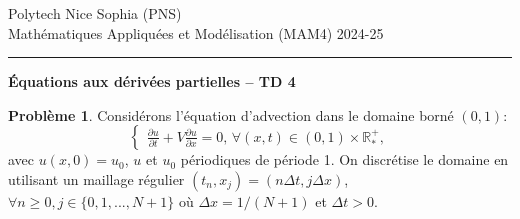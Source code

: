 \documentclass[12pt,a4paper]{article}
\begin{document}
 \hfill Polytech Nice Sophia (PNS)\\
\noindent Math\'ematiques Appliqu\'ees et Mod\'elisation (MAM4) \hfill 2024-25 \\

\hrule

\bigskip
\bigskip

\begin{center}{\bf \'Equations aux d\'eriv\'ees partielles --
TD 4}\end{center}

\bigskip

\parskip 12pt
{\bf Probl\`eme 1}. Consid\'erons l'\'equation d'advection dans le domaine born\'e $(0,1)$:
$$
\begin{cases}
\displaystyle\frac{\partial u}{\partial t}+V\frac{\partial u}{\partial
  x}=0,\, \forall (x,t)\in(0,1)\times\mathbb{R}^+_*,
\end{cases}
$$
avec $u(x, 0) = u_0$, $u$ et $u_0$ p\'eriodiques de p\'eriode 1.
On discr\'etise le domaine en utilisant un maillage r\'egulier
$(t_n,x_j)=(n\Delta t,j\Delta x)$,  $\forall n\ge 0,
j\in\{0,1,...,N+1\}$ o\`u $\Delta x=1/(N+1)$ et $\Delta t>0$.
\end{document}

